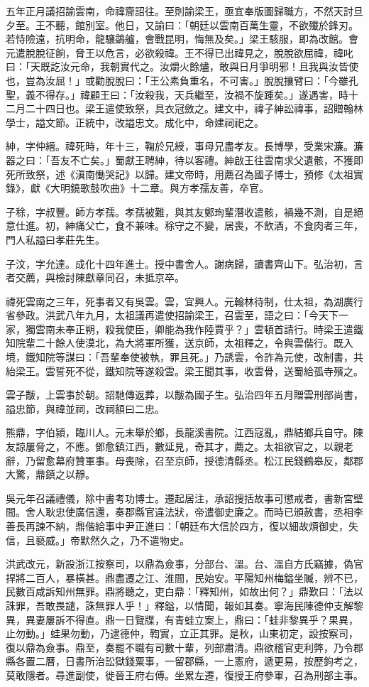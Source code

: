 \begin{pinyinscope}
五年正月議招諭雲南，命禕齎詔往。至則諭梁王，亟宜奉版圖歸職方，不然天討旦夕至。王不聽，館別室。他日，又諭曰：「朝廷以雲南百萬生靈，不欲殲於鋒刃。若恃險遠，抗明命，龍驤鷁艫，會戰昆明，悔無及矣。」梁王駭服，即為改館。會元遣脫脫征餉，脅王以危言，必欲殺禕。王不得已出禕見之，脫脫欲屈禕，禕叱曰：「天既訖汝元命，我朝實代之。汝爝火餘燼，敢與日月爭明邪！且我與汝皆使也，豈為汝屈！」或勸脫脫曰：「王公素負重名，不可害。」脫脫攘臂曰：「今雖孔聖，義不得存。」禕顧王曰：「汝殺我，天兵繼至，汝禍不旋踵矣。」遂遇害，時十二月二十四日也。梁王遣使致祭，具衣冠斂之。建文中，禕子紳訟禕事，詔贈翰林學士，謚文節。正統中，改謚忠文。成化中，命建祠祀之。

紳，字仲縉。禕死時，年十三，鞠於兄綬，事母兄盡孝友。長博學，受業宋濂。濂器之曰：「吾友不亡矣。」蜀獻王聘紳，待以客禮。紳啟王往雲南求父遺骸，不獲即死所致祭，述《滇南慟哭記》以歸。建文帝時，用薦召為國子博士，預修《太祖實錄》，獻《大明鐃歌鼓吹曲》十二章。與方孝孺友善，卒官。

子稌，字叔豐。師方孝孺。孝孺被難，與其友鄭珣輩潛收遣骸，禍幾不測，自是絕意仕進。初，紳痛父亡，食不兼味。稌守之不變，居喪，不飲酒，不食肉者三年，門人私謚曰孝莊先生。

子汶，字允達。成化十四年進士。授中書舍人。謝病歸，讀書齊山下。弘治初，言者交薦，與檢討陳獻章同召，未抵京卒。

禕死雲南之三年，死事者又有吳雲。雲，宜興人。元翰林待制，仕太祖，為湖廣行省參政。洪武八年九月，太祖議再遣使招諭梁王，召雲至，語之曰：「今天下一家，獨雲南未奉正朔，殺我使臣，卿能為我作陸賈乎？」雲頓首請行。時梁王遣鐵知院輩二十餘人使漠北，為大將軍所獲，送京師，太祖釋之，令與雲偕行。既入境，鐵知院等謀曰：「吾輩奉使被執，罪且死。」乃誘雲，令詐為元使，改制書，共紿梁王。雲誓死不從，鐵知院等遂殺雲。梁王聞其事，收雲骨，送蜀給孤寺殯之。

雲子黻，上雲事於朝。詔馳傳返葬，以黻為國子生。弘治四年五月贈雲刑部尚書，謚忠節，與禕並祠，改祠額曰二忠。

熊鼎，字伯潁，臨川人。元末舉於鄉，長龍溪書院。江西寇亂，鼎結鄉兵自守。陳友諒屢脅之，不應。鄧愈鎮江西，數延見，奇其才，薦之。太祖欲官之，以親老辭，乃留愈幕府贊軍事。母喪除，召至京師，授德清縣丞。松江民錢鶴皋反，鄰郡大驚，鼎鎮之以靜。

吳元年召議禮儀，除中書考功博士。遷起居注，承詔搜括故事可懲戒者，書新宮壁間。舍人耿忠使廣信還，奏郡縣官違法狀，帝遣御史廉之。而時已頒赦書，丞相李善長再諫不納，鼎偕給事中尹正進曰：「朝廷布大信於四方，復以細故煩御史，失信，且褻威。」帝默然久之，乃不遣物史。

洪武改元，新設浙江按察司，以鼎為僉事，分部台、溫。台、溫自方氏竊據，偽官捍將二百人，暴橫甚。鼎盡遷之江、淮間，民始安。平陽知州梅鎰坐贓，辨不已，民數百咸訴知州無罪。鼎將聽之，吏白鼎：「釋知州，如故出何？」鼎歎曰：「法以誅罪，吾敢畏譴，誅無罪人乎！」釋鎰，以情聞，報如其奏。寧海民陳德仲支解黎異，異妻屢訴不得直。鼎一日覽牒，有青蛙立案上，鼎曰：「蛙非黎異乎？果異，止勿動。」蛙果勿動，乃逮德仲，鞫實，立正其罪。是秋，山東初定，設按察司，復以鼎為僉事。鼎至，奏罷不職有司數十輩，列部肅清。鼎欲稽官吏利弊，乃令郡縣各置二曆，日書所治訟獄錢粟事，一留郡縣，一上憲府，遞更易，按歷鉤考之，莫敢隱者。尋進副使，徙晉王府右傅。坐累左遷，復授王府參軍，召為刑部主事。


\end{pinyinscope}
